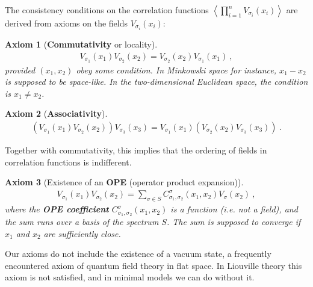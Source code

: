 \documentclass[12pt, a4paper, notitlepage, twoside]{report}
\numberwithin{equation}{section}
\theoremstyle{break}
\newtheorem{hyp}{Axiom}[chapter]
\begin{document}
The consistency conditions on the correlation functions $\left\langle\prod_{i=1}^n V_{\sigma_i}(x_i)\right\rangle$ are derived from axioms on the fields $V_{\sigma_i}(x_i)$:

\begin{hyp}[\textbf{Commutativity} or locality]
\label{ax:col}
\begin{align}
 \boxed{V_{\sigma_1}(x_1)V_{\sigma_2}(x_2) = V_{\sigma_2}(x_2) V_{\sigma_1}(x_1)}\ ,
\label{comm}
\end{align}
provided $(x_1,x_2)$ obey some condition.
In Minkowski space for instance, $x_1-x_2$ is supposed to be space-like.
In the two-dimensional Euclidean space, the condition is $x_1\neq x_2$.
\end{hyp}
\begin{hyp}[\textbf{Associativity}]
\label{ax:ass}
\begin{align}
 \boxed{\left(V_{\sigma_1}(x_1)V_{\sigma_2}(x_2)\right) V_{\sigma_3}(x_3) = V_{\sigma_1}(x_1)  \left(V_{\sigma_2}(x_2) V_{\sigma_3}(x_3)\right)}\ .
\label{asso}
\end{align}
\end{hyp} 
\noindent
Together with commutativity, this implies that the ordering of fields in correlation functions is indifferent.
\begin{hyp}[Existence of an \textbf{\boldmath OPE} (operator product expansion)]
 \label{ax:ope}
 \begin{align}
 \boxed{V_{\sigma_1}(x_1)V_{\sigma_2}(x_2) = \sum_{\sigma\in S} C_{\sigma_1,\sigma_2}^{\sigma}(x_1,x_2) V_{\sigma}(x_2)}\ ,
\label{ope}
\end{align}
where the \textbf{\boldmath OPE coefficient} $C_{\sigma_1,\sigma_2}^{\sigma}(x_1,x_2)$ is a function (i.e.
not a field), and the sum runs over a basis of the spectrum $S$. 
The sum is supposed to converge if $x_1$ and $x_2$ are sufficiently close. 
\end{hyp} 
\noindent
Our axioms do not include the existence of a vacuum state, a frequently encountered axiom of quantum field theory in flat space.
In Liouville theory this axiom is not satisfied, and in minimal models we can do without it. 
\end{document}
